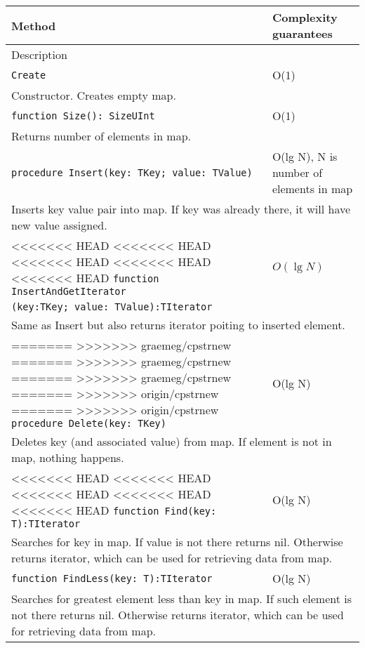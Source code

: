 \begin{longtable}{|m{10cm}|m{5cm}|}
\hline
Method & Complexity guarantees \\ \hline
\multicolumn{2}{|m{15cm}|}{Description} \\ \hline\hline

\verb!Create! & O(1) \\ \hline
\multicolumn{2}{|m{15cm}|}{Constructor. Creates empty map.} \\ \hline\hline

\verb!function Size(): SizeUInt! & O(1) \\ \hline
\multicolumn{2}{|m{15cm}|}{Returns number of elements in map.} \\\hline\hline

\verb!procedure Insert(key: TKey; value: TValue)! &
O(lg N), N is number of elements in map \\ \hline
\multicolumn{2}{|m{15cm}|}{Inserts key value pair into map. If key was already there, it will have
new value assigned.} \\\hline\hline

<<<<<<< HEAD
<<<<<<< HEAD
<<<<<<< HEAD
<<<<<<< HEAD
<<<<<<< HEAD
\verb!function InsertAndGetIterator! & $O(\lg N)$\\
\verb!(key:TKey; value: TValue):TIterator! & \\ \hline
\multicolumn{2}{|m{15cm}|}{Same as Insert but also returns iterator poiting to inserted element.} \\\hline\hline

=======
>>>>>>> graemeg/cpstrnew
=======
>>>>>>> graemeg/cpstrnew
=======
>>>>>>> graemeg/cpstrnew
=======
>>>>>>> origin/cpstrnew
=======
>>>>>>> origin/cpstrnew
\verb!procedure Delete(key: TKey)! &
O(lg N) \\ \hline
\multicolumn{2}{|m{15cm}|}{Deletes key (and associated value) from map. If element is not in map, nothing happens.} \\\hline\hline

<<<<<<< HEAD
<<<<<<< HEAD
<<<<<<< HEAD
<<<<<<< HEAD
<<<<<<< HEAD
\verb!function Find(key: T):TIterator! & O(lg N) \\\hline
\multicolumn{2}{|m{15cm}|}{Searches for key in map. If value is not there returns nil. Otherwise
returns iterator, which can be used for retrieving data from map.} \\\hline\hline

\verb!function FindLess(key: T):TIterator! & O(lg N) \\\hline
\multicolumn{2}{|m{15cm}|}{Searches for greatest element less than key in map. If such element is not there returns nil. Otherwise
returns iterator, which can be used for retrieving data from map.} \\\hline\hline


\end{longtable}
